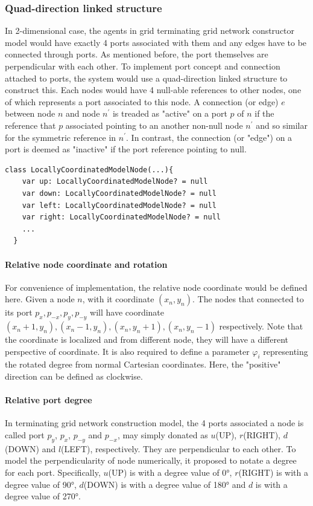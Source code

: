 \subsubsection{Quad-direction linked structure}
In 2-dimensional case, the agents in grid terminating grid network constructor model would have exactly 4 ports associated with them and
any edges have to be connected through ports. As mentioned before, the port themselves are perpendicular with each other.
To implement port concept and connection attached to ports,
the system would use a quad-direction linked structure to construct this. Each nodes would have 4 null-able references to other
nodes, one of which represents a port associated to this node. A connection (or edge) $e$ between node $n$ and node $n^{'}$ is treaded as "active" on a port $p$ of $n$ if the reference that
$p$ associated pointing to an another non-null node $n^{'}$ and so similar for the symmetric reference in $n^{'}$.
In contrast, the connection (or "edge") on a port is deemed as "inactive" if the port reference pointing to null.

\par\noindent
\begin{lstlisting}[caption = {Pseudo-code demonstration of quad-direction linked structure}, style = myjava]
  class LocallyCoordinatedModelNode(...){
    var up: LocallyCoordinatedModelNode? = null
    var down: LocallyCoordinatedModelNode? = null
    var left: LocallyCoordinatedModelNode? = null
    var right: LocallyCoordinatedModelNode? = null
    ...
  }
\end{lstlisting}

\paragraph{Relative node coordinate and rotation}
For convenience of implementation, the relative node coordinate would be defined here. Given
a node $n$, with it coordinate $(x_{n}, y_{n})$. The nodes that connected to its port $p_{x}, p_{-x}, p_{y}, p_{-y}$
will have coordinate $(x_{n} + 1, y_{n}), (x_{n} - 1, y_{n}), (x_{n}, y_{n} + 1), (x_{n}, y_{n} - 1)$ respectively.
Note that the coordinate is localized and from different node, they will have a different perspective of coordinate.
It is also required to define a parameter $\varphi_{i}$ representing the rotated degree from normal Cartesian coordinates.
Here, the "positive" direction can be defined as clockwise.

\paragraph{Relative port degree}
In terminating grid network construction model, the 4 ports associated a node is called
port $p_{y}$, $p_{x}$, $p_{-y}$ and $p_{-x}$, may simply donated as $u$(UP), $r$(RIGHT), $d$(DOWN) and $l$(LEFT), respectively.
They are perpendicular to each other. To model the perpendicularity of node numerically,
it proposed to notate a degree for each port. Specifically, $u$(UP) is with a degree value of
\ang{0},  $r$(RIGHT) is with a degree value of \ang{90}, $d$(DOWN) is with a degree value of
\ang{180} and $d$ is with a degree value of \ang{270}.

